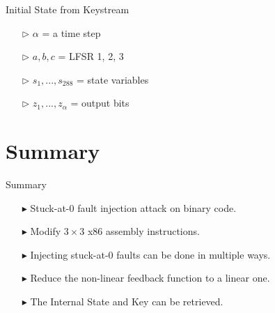 \documentclass[conference]{IEEEtran}
\begin{document}
Initial State from Keystream

\begin{itemize}
\item[$\triangleright$] $\alpha$ = a time step
\item[$\triangleright$] $a, b, c$ = LFSR 1, 2, 3
\item[$\triangleright$] $s_1,...,s_{288}$ = state variables
\item[$\triangleright$] $z_1,...,z_{\alpha}$ = output bits
\end{itemize}

\section{Summary}

Summary
\begin{itemize}[itemsep=0.5cm]
\item[$\blacktriangleright$] Stuck-at-0 fault injection attack on binary code.
\item[$\blacktriangleright$] Modify $3 \times 3$ x86 assembly instructions.
\item[$\blacktriangleright$] Injecting stuck-at-0 faults can be done in multiple ways.
\item[$\blacktriangleright$] Reduce the non-linear feedback function to a linear one.
\item[$\blacktriangleright$] The Internal State and Key can be retrieved. 
\end{itemize}
\end{document}
